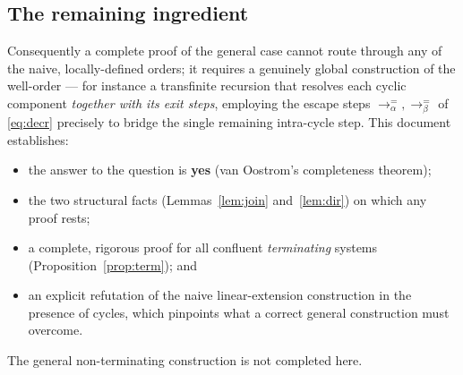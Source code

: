 \documentclass{amsart}
\theoremstyle{definition}
\theoremstyle{remark}
\newcommand{\redto}{\rightarrow}
\begin{document}
\subsection*{The remaining ingredient}
Consequently a complete proof of the general case cannot route through any of the
naive, locally-defined orders; it requires a genuinely global construction of
the well-order --- for instance a transfinite recursion that resolves each
cyclic component \emph{together with its exit steps}, employing the escape steps
$\redto^{=}_\alpha,\redto^{=}_\beta$ of \eqref{eq:decr} precisely to bridge the
single remaining intra-cycle step.  This document establishes:
\begin{itemize}
\item the answer to the question is \textbf{yes} (van Oostrom's completeness
theorem);
\item the two structural facts (Lemmas~\ref{lem:join} and~\ref{lem:dir}) on
which any proof rests;
\item a complete, rigorous proof for all confluent \emph{terminating} systems
(Proposition~\ref{prop:term}); and
\item an explicit refutation of the naive linear-extension construction in the
presence of cycles, which pinpoints what a correct general construction must
overcome.
\end{itemize}
The general non-terminating construction is not completed here.
\end{document}

